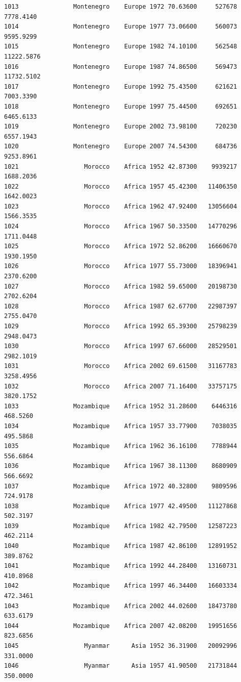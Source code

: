 \documentclass[
  letterpaper,
  DIV=11,
  numbers=noendperiod]{scrreprt}
\begin{document}
\begin{verbatim}
1013               Montenegro    Europe 1972 70.63600     527678   7778.4140
1014               Montenegro    Europe 1977 73.06600     560073   9595.9299
1015               Montenegro    Europe 1982 74.10100     562548  11222.5876
1016               Montenegro    Europe 1987 74.86500     569473  11732.5102
1017               Montenegro    Europe 1992 75.43500     621621   7003.3390
1018               Montenegro    Europe 1997 75.44500     692651   6465.6133
1019               Montenegro    Europe 2002 73.98100     720230   6557.1943
1020               Montenegro    Europe 2007 74.54300     684736   9253.8961
1021                  Morocco    Africa 1952 42.87300    9939217   1688.2036
1022                  Morocco    Africa 1957 45.42300   11406350   1642.0023
1023                  Morocco    Africa 1962 47.92400   13056604   1566.3535
1024                  Morocco    Africa 1967 50.33500   14770296   1711.0448
1025                  Morocco    Africa 1972 52.86200   16660670   1930.1950
1026                  Morocco    Africa 1977 55.73000   18396941   2370.6200
1027                  Morocco    Africa 1982 59.65000   20198730   2702.6204
1028                  Morocco    Africa 1987 62.67700   22987397   2755.0470
1029                  Morocco    Africa 1992 65.39300   25798239   2948.0473
1030                  Morocco    Africa 1997 67.66000   28529501   2982.1019
1031                  Morocco    Africa 2002 69.61500   31167783   3258.4956
1032                  Morocco    Africa 2007 71.16400   33757175   3820.1752
1033               Mozambique    Africa 1952 31.28600    6446316    468.5260
1034               Mozambique    Africa 1957 33.77900    7038035    495.5868
1035               Mozambique    Africa 1962 36.16100    7788944    556.6864
1036               Mozambique    Africa 1967 38.11300    8680909    566.6692
1037               Mozambique    Africa 1972 40.32800    9809596    724.9178
1038               Mozambique    Africa 1977 42.49500   11127868    502.3197
1039               Mozambique    Africa 1982 42.79500   12587223    462.2114
1040               Mozambique    Africa 1987 42.86100   12891952    389.8762
1041               Mozambique    Africa 1992 44.28400   13160731    410.8968
1042               Mozambique    Africa 1997 46.34400   16603334    472.3461
1043               Mozambique    Africa 2002 44.02600   18473780    633.6179
1044               Mozambique    Africa 2007 42.08200   19951656    823.6856
1045                  Myanmar      Asia 1952 36.31900   20092996    331.0000
1046                  Myanmar      Asia 1957 41.90500   21731844    350.0000

\end{verbatim}
\end{document}
